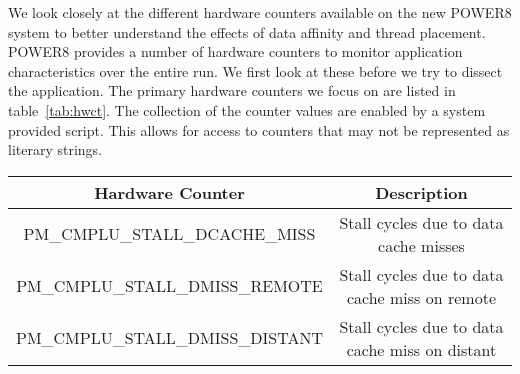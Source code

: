We look closely at the different hardware counters available on the new POWER8 system to better understand the effects of data affinity and thread placement. POWER8 provides a number of hardware counters to monitor application characteristics over the entire run. We first look at these before we try to dissect  the application. The primary hardware counters we focus on are listed in table~\ref{tab:hwct}. The collection of the counter values are enabled by a system provided script. This allows for access to counters that may not be represented as literary strings. 

\begin{table*}[t]
\vspace{-0.5pc}
\caption{POWER8 Relevant Counters}
\centering
\begin{tabular} { | c | c | }
\hline
{\bf Hardware Counter} & {\bf Description}  \\ \hline
PM\_CMPLU\_STALL\_DCACHE\_MISS & Stall cycles due to data cache misses	\\	\hline
PM\_CMPLU\_STALL\_DMISS\_REMOTE & Stall cycles due to data cache miss on remote \\	\hline
PM\_CMPLU\_STALL\_DMISS\_DISTANT & Stall cycles due to data cache miss on distant \\ \hline
\end{tabular}
\label{tab:hwct}
\end{table*}
